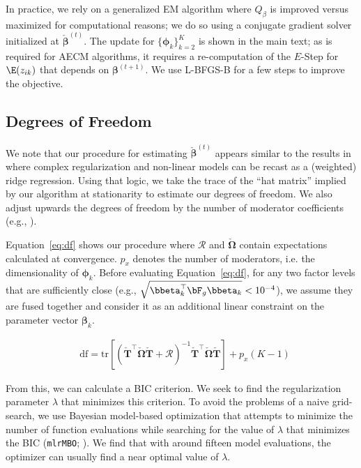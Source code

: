 In practice, we rely on a generalized EM algorithm where $Q_\beta$ is
improved versus maximized for computational reasons; we do so using a
conjugate gradient solver initialized at
$\check{\bm{\beta}}^{(t)}$. The update for $\{\bm{\phi}_k\}_{k=2}^K$
is shown in the main text; as is required for AECM algorithms, it requires a re-computation of the $E$-Step for $\E(z_{ik})$ that depends on $\bm{\beta}^{(t+1)}$. We use L-BFGS-B for a few steps to improve the objective.

\subsection{Degrees of Freedom}
\label{sec:app_derivations_df}

We note that our procedure for estimating $\check{\bm{\beta}}^{(t)}$
appears similar to the results in \cite{oelker2017uniform} where
complex regularization and non-linear models can be recast as a
(weighted) ridge regression. Using that logic, we take the trace of
the ``hat matrix'' implied by our algorithm at stationarity to
estimate our degrees of freedom. We also adjust upwards the degrees of
freedom by the number of moderator coefficients (e.g.,
\citealt{khalili2010mixture,chamroukhi2019regularized}).

Equation~\eqref{eq:df} shows our procedure where $\bm{\mathcal{R}}$
and $\check{\bm{\Omega}}$ contain expectations calculated at
convergence. $p_x$ denotes the number of moderators, i.e. the
dimensionality of $\bm{\phi}_k$. Before evaluating
Equation~\eqref{eq:df}, for any two factor levels that are
sufficiently close (e.g.,
$\sqrt{\bbeta_k^\top\bF_g \bbeta_k} < 10^{-4}$), we assume they are
fused together and consider it as an additional linear constraint on
the parameter vector $\bm{\beta}_k$.

\begin{equation}
\label{eq:df}
\begin{split}
&\mathrm{df} = \mathrm{tr}\left[\left(\check{\bm{T}}^\top \check{\bm{\Omega}} \check{\bm{T}} + \bm{\mathcal{R}}\right)^{-1} \check{\bm{T}}^\top \check{\bm{\Omega}} \check{\bm{T}}\right] + p_x \left(K - 1\right)
\end{split}
\end{equation}

From this, we can calculate a BIC criterion. We seek to find the
regularization parameter $\lambda$ that minimizes this criterion. To
avoid the problems of a naive grid-search, we use Bayesian model-based
optimization that attempts to minimize the number of function
evaluations while searching for the value of $\lambda$ that minimizes
the BIC (\texttt{mlrMBO}; \citealt{bischl2018mlrmbo}). We find that
with around fifteen model evaluations, the optimizer can usually find
a near optimal value of $\lambda$.

